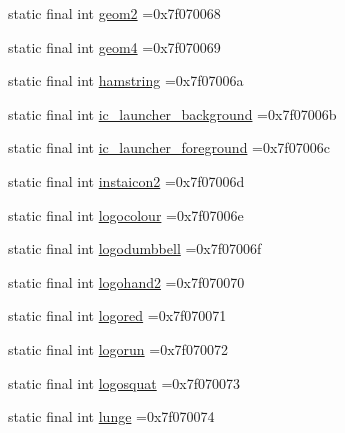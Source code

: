 \begin{DoxyCompactItemize}
\item 
static final int \mbox{\hyperlink{classcom_1_1example_1_1trainawearapplication_1_1_r_1_1drawable_ae3732955fe76d8dd4a7666ef3828fa45}{geom2}} =0x7f070068
\item 
static final int \mbox{\hyperlink{classcom_1_1example_1_1trainawearapplication_1_1_r_1_1drawable_a436bbccdd26b5d6b74a2f71a0185b65d}{geom4}} =0x7f070069
\item 
static final int \mbox{\hyperlink{classcom_1_1example_1_1trainawearapplication_1_1_r_1_1drawable_a119c64553ec57e48a181a217d7701d08}{hamstring}} =0x7f07006a
\item 
static final int \mbox{\hyperlink{classcom_1_1example_1_1trainawearapplication_1_1_r_1_1drawable_a88238d5cb59bda1f1da5dfcddc44455a}{ic\+\_\+launcher\+\_\+background}} =0x7f07006b
\item 
static final int \mbox{\hyperlink{classcom_1_1example_1_1trainawearapplication_1_1_r_1_1drawable_afd7417b7c3d91fa76fcde0332fbe3c1a}{ic\+\_\+launcher\+\_\+foreground}} =0x7f07006c
\item 
static final int \mbox{\hyperlink{classcom_1_1example_1_1trainawearapplication_1_1_r_1_1drawable_aca9c57f0fe521565d05ab2f7b235b9f8}{instaicon2}} =0x7f07006d
\item 
static final int \mbox{\hyperlink{classcom_1_1example_1_1trainawearapplication_1_1_r_1_1drawable_ab23ec54f94e51f8d391612839a8893a1}{logocolour}} =0x7f07006e
\item 
static final int \mbox{\hyperlink{classcom_1_1example_1_1trainawearapplication_1_1_r_1_1drawable_a2aba688ffaf1d82dc9a140758dc8281a}{logodumbbell}} =0x7f07006f
\item 
static final int \mbox{\hyperlink{classcom_1_1example_1_1trainawearapplication_1_1_r_1_1drawable_ad40d914bf6d14e5646cc1a734543d53e}{logohand2}} =0x7f070070
\item 
static final int \mbox{\hyperlink{classcom_1_1example_1_1trainawearapplication_1_1_r_1_1drawable_afb89c247fcf1e065406ef61e1c32d197}{logored}} =0x7f070071
\item 
static final int \mbox{\hyperlink{classcom_1_1example_1_1trainawearapplication_1_1_r_1_1drawable_a71320c275f1af6b3e273b454038cd784}{logorun}} =0x7f070072
\item 
static final int \mbox{\hyperlink{classcom_1_1example_1_1trainawearapplication_1_1_r_1_1drawable_ad4a9c2314179b2ee467a8d7b5e9cb6c0}{logosquat}} =0x7f070073
\item 
static final int \mbox{\hyperlink{classcom_1_1example_1_1trainawearapplication_1_1_r_1_1drawable_affff11d2223bdd47934710696305d0e0}{lunge}} =0x7f070074

\end{DoxyCompactItemize}
